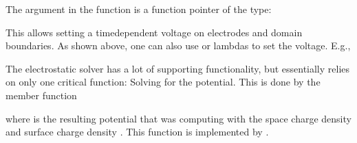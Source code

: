 \documentclass[letterpaper,10pt,english]{sphinxmanual}
\begin{document}
\sphinxAtStartPar
The argument in the function  is a function pointer of the type:

\begin{sphinxVerbatim}[commandchars=\\\{\},formatcom=\scriptsize]
   
\end{sphinxVerbatim}

\sphinxAtStartPar
This allows setting a time\sphinxhyphen{}dependent voltage on electrodes and domain boundaries.
As shown above, one can also use  or lambdas to set the voltage.
E.g.,

\begin{sphinxVerbatim}[commandchars=\\\{\},formatcom=\scriptsize]
 

   \PYG{p}{[}\PYG{p}{]}      
    

\end{sphinxVerbatim}

\sphinxAtStartPar
The electrostatic solver  has a lot of supporting functionality, but essentially relies on only one critical function:
Solving for the potential.
This is done by the member function

\begin{sphinxVerbatim}[commandchars=\\\{\},formatcom=\scriptsize]
        
\end{sphinxVerbatim}

\sphinxAtStartPar
where  is the resulting potential that was computing with the space charge density  and surface charge density .
This function is implemented by {\hyperref[\detokenize{Solvers/Electrostatics:chap-fieldsolvermultigrid}]{}}.
\end{document}
